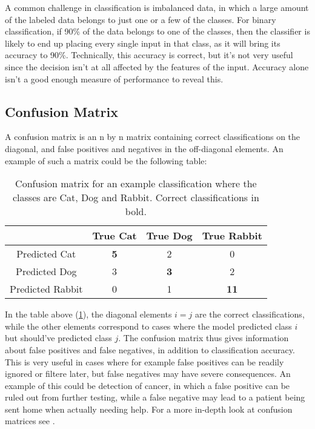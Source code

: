 A common challenge in classification is imbalanced data, in which a large
amount of the labeled data belongs to just one or a few of the classes.
For binary classification, if 90\% of the data belongs to one of the classes,
then the classifier is likely to end up placing every single
input in that class, as it will bring its accuracy to 90\%. Technically, this
accuracy is correct, but it's not very useful since the decision isn't at all
affected by the features of the input. Accuracy alone isn't a good enough
measure of performance to reveal this.

\subsection{Confusion Matrix}
A confusion matrix is an n by n matrix containing correct classifications
on the diagonal, and false positives and negatives in the off-diagonal elements.
An example of such a matrix could be the following table:
\begin{table}[h]
    \centering
    \begin{tabular}{c|c|c|c}
     & True Cat & True Dog & True Rabbit \\
    \hline
    Predicted Cat & \textbf{5} & 2 & 0 \\
    \hline
    Predicted Dog & 3 & \textbf{3} & 2 \\
    \hline
    Predicted Rabbit & 0 & 1 & \textbf{11} \\
\end{tabular}
\caption{Confusion matrix for an example classification where the classes
         are Cat, Dog and Rabbit. Correct classifications in bold.}
\label{tab:confmat-example}
\end{table}
In the table above (\ref{tab:confmat-example}), the diagonal elements
$i = j$ are the correct classifications, while the other elements correspond
to cases where the model predicted class $i$ but should've predicted class $j$.
The confusion matrix thus gives information about false positives and false
negatives, in addition to classification accuracy. This is very useful
in cases where for example false positives can be readily ignored or filtere
later, but false negatives may have severe consequences. An example of this
could be detection of cancer, in which a false positive can be ruled out
from further testing, while a false negative may lead to a patient being sent
home when actually needing help. For a more in-depth look at confusion matrices
see \cite{Fawcett2006}.

